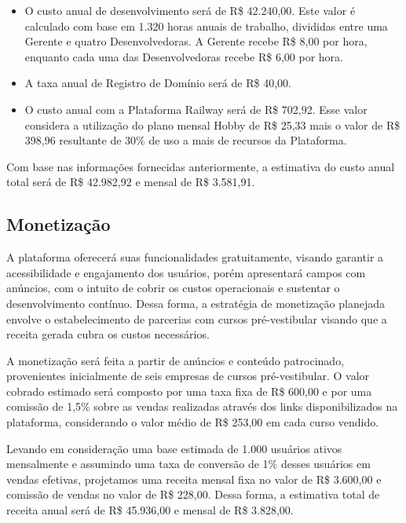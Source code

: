 \begin{itemize}
        \item O custo anual de desenvolvimento será de R\$ 42.240,00. Este valor é calculado com base em 1.320 horas anuais de trabalho, divididas entre uma Gerente e quatro Desenvolvedoras. A Gerente recebe R\$ 8,00 por hora, enquanto cada uma das Desenvolvedoras recebe R\$ 6,00 por hora.
    \end{itemize}
\begin{itemize}
    \item A taxa anual de Registro de Domínio será de R\$ 40,00.
\end{itemize}
\begin{itemize}
    \item O custo anual com a Plataforma Railway será de R\$ 702,92. Esse valor considera a utilização do plano mensal Hobby de R\$ 25,33 mais o valor de R\$ 398,96 resultante de 30\% de uso a mais de recursos da Plataforma.
\end{itemize}

Com base nas informações fornecidas anteriormente, a estimativa do custo anual total será de R\$ 42.982,92 e mensal de R\$ 3.581,91.

\subsection{Monetização}

A plataforma oferecerá suas funcionalidades gratuitamente, visando garantir a acessibilidade e engajamento dos usuários, porém apresentará campos com anúncios, com o intuito de cobrir os custos operacionais e sustentar o desenvolvimento contínuo. Dessa forma, a estratégia de monetização planejada envolve o estabelecimento de parcerias com cursos pré-vestibular visando que a receita gerada cubra os custos necessários. 

A monetização será feita a partir de anúncios e conteúdo patrocinado, provenientes inicialmente de seis empresas de cursos pré-vestibular. O valor cobrado estimado será composto por uma taxa fixa de R\$ 600,00 e por uma comissão de 1,5\% sobre as vendas realizadas através dos links disponibilizados na plataforma, considerando o valor médio de R\$ 253,00 em cada curso vendido. 

Levando em consideração uma base estimada de 1.000 usuários ativos mensalmente e assumindo uma taxa de conversão de 1\% desses usuários em vendas efetivas, projetamos uma receita mensal fixa no valor de R\$ 3.600,00 e comissão de vendas no valor de R\$ 228,00. Dessa forma, a estimativa total de receita anual será de R\$ 45.936,00 e mensal de R\$ 3.828,00.

